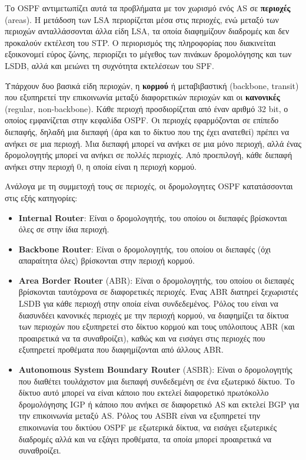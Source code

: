 \documentclass{EdipyLabs} %
\begin{document}
Το OSPF αντιμετωπίζει αυτά τα προβλήματα με τον χωρισμό ενός AS σε \textbf{περιοχές} (areas). Η μετάδοση των LSA περιορίζεται μέσα στις περιοχές, ενώ μεταξύ των περιοχών ανταλλάσσονται άλλα είδη LSA, τα οποία διαφημίζουν διαδρομές και δεν προκαλούν εκτέλεση του STP. Ο περιορισμός της πληροφορίας που διακινείται εξοικονομεί εύρος ζώνης, περιορίζει το μέγεθος των πινάκων δρομολόγησης και των LSDB, αλλά και μειώνει τη συχνότητα εκτελέσεων του SPF.

Υπάρχουν δυο βασικά είδη περιοχών, η \textbf{κορμού} ή μεταβιβαστική (backbone, transit) που εξυπηρετεί την επικοινωνία μεταξύ διαφορετικών περιοχών και οι \textbf{κανονικές} (regular, non-backbone). Κάθε περιοχή προσδιορίζεται από έναν αριθμό 32 bit, ο οποίος εμφανίζεται στην κεφαλίδα OSPF. Οι περιοχές εφαρμόζονται σε επίπεδο διεπαφής, δηλαδή μια διεπαφή (άρα και το δίκτυο που της έχει ανατεθεί) πρέπει να ανήκει σε μια περιοχή. Μια διεπαφή μπορεί να ανήκει σε μια μόνο περιοχή, αλλά ένας δρομολογητής μπορεί να ανήκει σε πολλές περιοχές. Από προεπιλογή, κάθε διεπαφή ανήκει στην περιοχή 0, η οποία είναι η περιοχή κορμού. 

Ανάλογα με τη συμμετοχή τους σε περιοχές, οι δρομολογητες OSPF κατατάσσονται στις εξής κατηγορίες:
\begin{itemize}
	\item \textbf{Internal Router}: Είναι ο δρομολογητής, του οποίου οι διεπαφές βρίσκονται όλες σε στην ίδια περιοχή.
	
	\item \textbf{Backbone Router}: Είναι ο δρομολογητής, του οποίου οι διεπαφές (όχι απαραίτητα όλες) βρίσκονται στην περιοχή κορμού.
	
	\item \textbf{Area Border Router} (ABR): Είναι ο δρομολογητής, του οποίου οι διεπαφές βρίσκονται ταυτόχρονα σε διαφορετικές περιοχές. Ένας ABR διατηρεί ξεχωριστές LSDB για κάθε περιοχή στην οποία είναι συνδεδεμένος. Ρόλος του είναι να διασυνδέει κανονικές περιοχές με την περιοχή κορμού, να διαφημίζει τα δίκτυα των περιοχών που εξυπηρετεί στο δίκτυο κορμού και τους υπόλοιπους ABR (και προαιρετικά να τα συναθροίζει), καθώς και να εισάγει στις περιοχές που εξυπηρετεί προθέματα που διαφημίζονται από άλλους ABR.
	
	\item \textbf{Autonomous System Boundary Router} (ASBR): Είναι ο δρομολογητής που διαθέτει τουλάχιστον μια διεπαφή συνδεδεμένη σε ένα εξωτερικό δίκτυο. Το δίκτυο αυτό μπορεί να είναι κάποιο που εκτελεί διαφορετικό πρωτόκολλο δρομολόγησης IGP ή κάποιο που ανήκει σε διαφορετικό AS και εκτελεί BGP για την επικοινωνία μεταξύ AS. Ρόλος του ASBR είναι να εξυπηρετεί την επικοινωνία του δικτύου OSPF με εξωτερικά δίκτυα, να εισάγει εξωτερικές διαδρομές αλλά και να εξάγει προθέματα, τα οποία μπορεί προαιρετικά να συναθροίζει.
\end{itemize}
\end{document}
